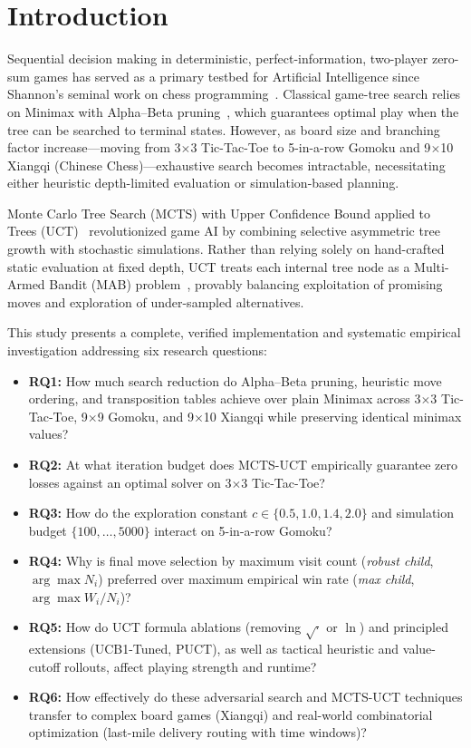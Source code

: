 \documentclass[conference]{IEEEtran}
\begin{document}
\section{Introduction}
Sequential decision making in deterministic, perfect-information, two-player zero-sum games has served as a primary testbed for Artificial Intelligence since Shannon's seminal work on chess programming~\cite{shannon1950}. Classical game-tree search relies on Minimax with Alpha--Beta pruning~\cite{knuth1975}, which guarantees optimal play when the tree can be searched to terminal states. However, as board size and branching factor increase---moving from 3$\times$3 Tic-Tac-Toe to 5-in-a-row Gomoku and 9$\times$10 Xiangqi (Chinese Chess)---exhaustive search becomes intractable, necessitating either heuristic depth-limited evaluation or simulation-based planning.

Monte Carlo Tree Search (MCTS) with Upper Confidence Bound applied to Trees (UCT)~\cite{kocsis2006,browne2012} revolutionized game AI by combining selective asymmetric tree growth with stochastic simulations. Rather than relying solely on hand-crafted static evaluation at fixed depth, UCT treats each internal tree node as a Multi-Armed Bandit (MAB) problem~\cite{auer2002}, provably balancing exploitation of promising moves and exploration of under-sampled alternatives.

This study presents a complete, verified implementation and systematic empirical investigation addressing six research questions:
\begin{itemize}
    \item \textbf{RQ1:} How much search reduction do Alpha--Beta pruning, heuristic move ordering, and transposition tables achieve over plain Minimax across 3$\times$3 Tic-Tac-Toe, 9$\times$9 Gomoku, and 9$\times$10 Xiangqi while preserving identical minimax values?
    \item \textbf{RQ2:} At what iteration budget does MCTS-UCT empirically guarantee zero losses against an optimal solver on 3$\times$3 Tic-Tac-Toe?
    \item \textbf{RQ3:} How do the exploration constant $c \in \{0.5, 1.0, 1.4, 2.0\}$ and simulation budget $\{100, \dots, 5000\}$ interact on 5-in-a-row Gomoku?
    \item \textbf{RQ4:} Why is final move selection by maximum visit count (\emph{robust child}, $\arg\max N_i$) preferred over maximum empirical win rate (\emph{max child}, $\arg\max W_i/N_i$)?
    \item \textbf{RQ5:} How do UCT formula ablations (removing $\sqrt{\cdot}$ or $\ln$) and principled extensions (UCB1-Tuned, PUCT), as well as tactical heuristic and value-cutoff rollouts, affect playing strength and runtime?
    \item \textbf{RQ6:} How effectively do these adversarial search and MCTS-UCT techniques transfer to complex board games (Xiangqi) and real-world combinatorial optimization (last-mile delivery routing with time windows)?
\end{itemize}
\end{document}
